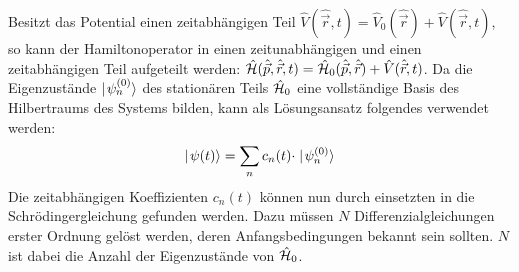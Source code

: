 Besitzt das Potential einen zeitabhängigen Teil $\hat{V}(\hat{\vec{r}},t)=\hat{V}_0(\hat{\vec{r}})+\hat{V}(\hat{\vec{r}},t)$, so kann der Hamiltonoperator in einen zeitunabhängigen und einen zeitabhängigen Teil aufgeteilt werden: $\hat{\mathcal H}(\hat{\vec{p}},\hat{\vec{r}},t)=\hat{\mathcal H}_0(\hat{\vec{p}},\hat{\vec{r}})+\hat{V}(\hat{\vec{r}},t)$. Da die Eigenzustände $\mid\!\!\!\,\,{\psi_n^{(0)}}\rangle$ des stationären Teils $\hat{\mathcal H}_0$ eine vollständige Basis des Hilbertraums des Systems bilden, kann als Lösungsansatz folgendes verwendet werden: 
\begin{eqnarray*}
	\mid\!\!\!\,\,{\psi(t)}\rangle = \sum_n c_n(t)\cdot\mid\!\!\!\,\,{\psi_n^{(0)}}\rangle
\end{eqnarray*}
Die zeitabhängigen Koeffizienten $c_n(t)$ können nun durch einsetzten in die Schrödingergleichung gefunden werden. Dazu müssen $N$ Differenzialgleichungen erster Ordnung gelöst werden, deren Anfangsbedingungen bekannt sein sollten. $N$ ist dabei die Anzahl der Eigenzustände von $\hat{\mathcal H}_0$.


